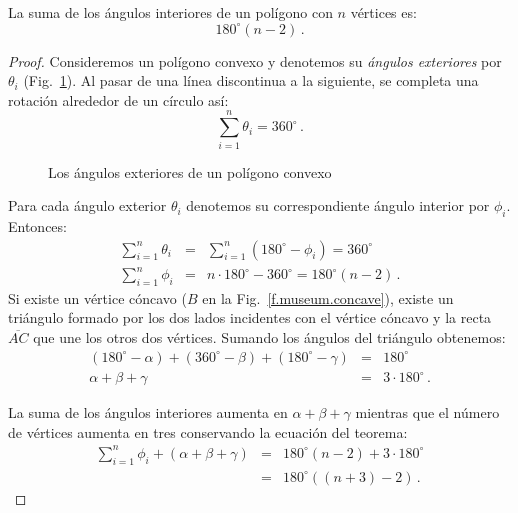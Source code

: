 \begin{theorem}\label{thm.interior-angles-of-a-polygon}
La suma de los ángulos interiores de un polígono con $n$ vértices es:
\[180^\circ(n-2)\,.\]
\end{theorem}
\begin{proof}
Consideremos un polígono convexo y denotemos su \emph{ángulos exteriores} por $\theta_i$ (Fig.~\ref{f.museum.exterior}).
Al pasar de una línea discontinua a la siguiente, se completa una rotación alrededor de un círculo así:
\[
\sum_{i=1}^n \theta_i = 360^\circ\,.
\]
\begin{figure}[t]
\begin{center}
\end{center}
\caption{Los ángulos exteriores de un polígono convexo}\label{f.museum.exterior}
\end{figure}
Para cada ángulo exterior $\theta_i$ denotemos su correspondiente ángulo interior por $\phi_i$. Entonces:
\begin{eqnarray*}
\displaystyle\sum_{i=1}^n \theta_i &=&\displaystyle\sum_{i=1}^n (180^\circ-\phi_i)= 360^\circ\\
\displaystyle\sum_{i=1}^n \phi_i &=& n\cdot 180^\circ-360^\circ =180^\circ(n-2)\,.
\end{eqnarray*}
Si existe un vértice cóncavo ($B$ en la Fig.~\ref{f.museum.concave}), existe un triángulo formado por los dos lados incidentes con el vértice cóncavo y la recta $\overline{AC}$ que une los otros dos vértices. Sumando los ángulos del triángulo obtenemos:
\begin{eqnarray*}
(180^\circ - \alpha) + (360^\circ - \beta) + (180^\circ - \gamma) &=& 180^\circ\\
\alpha + \beta + \gamma &=& 3\cdot 180^\circ\,.
\end{eqnarray*}

La suma de los ángulos interiores aumenta en $\alpha+\beta+\gamma$ mientras que el número de vértices aumenta en tres conservando la ecuación del teorema:
\begin{eqnarray*}
\displaystyle\sum_{i=1}^n \phi_i + (\alpha + \beta + \gamma) &=& 180^\circ(n-2)+3\cdot 180^\circ\\
&=& 180^\circ((n+3)-2)\,.
\end{eqnarray*}
\end{proof}

